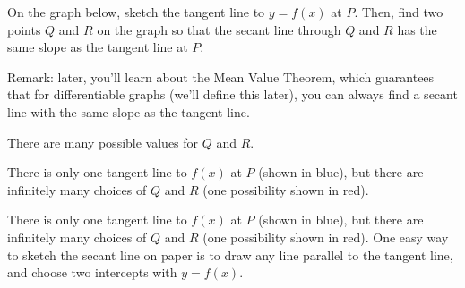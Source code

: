 \begin{Mquestion}On the graph below, sketch the tangent line to $y=f(x)$ at $P$. Then, find two points $Q$ and $R$  on the graph so that the secant line through $Q$ and $R$ has the same slope as the tangent line at $P$.
\begin{center}
\end{center}
Remark: later, you'll learn about the Mean Value Theorem, which guarantees that for differentiable graphs (we'll define this later),
             you can always find a secant line with the same slope as the tangent line.
\end{Mquestion}
\begin{hint} There are many possible values for $Q$ and $R$.
\end{hint}
\begin{answer} There is only one tangent line to $f(x)$ at $P$ (shown in blue), but there are infinitely many choices of $Q$ and $R$ (one possibility shown in red).
\begin{center}
\end{center}
\end{answer}
\begin{solution} There is only one tangent line to $f(x)$ at $P$ (shown in blue), but there are infinitely many choices of $Q$ and $R$ (one possibility shown in red).
One easy way to sketch the secant line on paper is to draw any line parallel to the tangent line, and choose two intercepts with $y=f(x)$.
\begin{center}
\end{center}
\end{solution}


